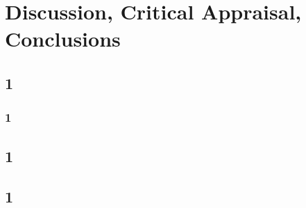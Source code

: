 \chapter{Discussion, Critical Appraisal, Conclusions} %
\label{Chapter8} %
\section{1}

\par 

\subsection{1}

\par 

\section{1}

\par 

\section{1}

\par 

